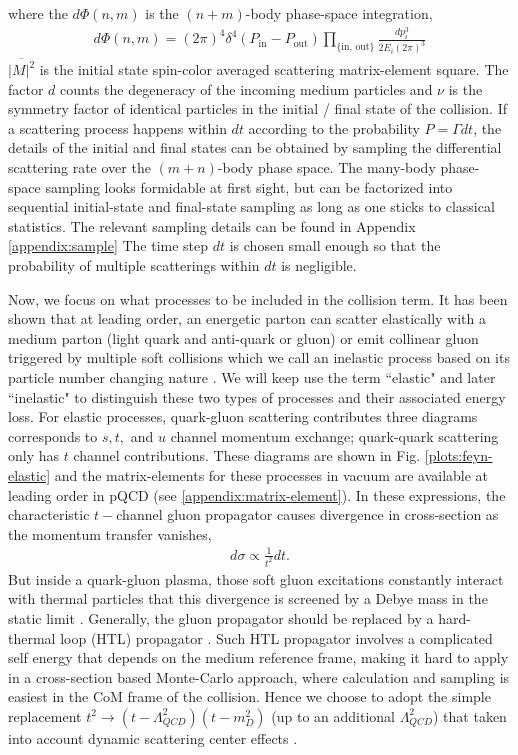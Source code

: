 \documentclass[aps, prc, reprint, amsmath, groupedaddress, nofootinbib]{revtex4-1}
\begin{document}
where the $d\Phi(n,m)$ is the $(n+m)$-body phase-space integration,
\begin{eqnarray}
\nonumber
d\Phi(n,m) = (2\pi)^4\delta^4\left(P_{\textrm{in}}-P_{\textrm{out}}\right)\prod_{\{\textrm{in, out}\}} \frac{dp_i^3}{2E_i(2\pi)^3} 
\end{eqnarray}
$\overline{|M|^2}$ is the initial state spin-color averaged scattering matrix-element square.
The factor $d$ counts the degeneracy of the incoming medium particles and $\nu$ is the symmetry factor of identical particles in the initial / final state of the collision.
If a scattering process happens within $dt$ according to the probability $P=\Gamma dt$, the details of the initial and final states can be obtained by sampling the differential scattering rate over the $(m+n)$-body phase space.
The many-body phase-space sampling looks formidable at first sight, but can be factorized into sequential initial-state and final-state sampling as long as one sticks to classical statistics.
The relevant sampling details can be found in Appendix \ref{appendix:sample}
The time step $dt$ is chosen small enough so that the probability of multiple scatterings within $dt$ is negligible. 

Now, we focus on what processes to be included in the collision term.
It has been shown that at leading order, an energetic parton can scatter elastically with a medium parton (light quark and anti-quark or gluon) or emit collinear gluon triggered by multiple soft collisions which we call an inelastic process based on its particle number changing nature \cite{Arnold:2002zm}.
We will keep use the term ``elastic" and later ``inelastic" to distinguish these two types of processes and their associated energy loss.
For elastic processes, quark-gluon scattering contributes three diagrams corresponds to $s, t,$ and $u$ channel momentum exchange; quark-quark scattering only has $t$ channel contributions. 
These diagrams are shown in Fig. \ref{plots:feyn-elastic} and the matrix-elements for these processes in vacuum are available at leading order in pQCD (see \ref{appendix:matrix-element}).
In these expressions, the characteristic $t-$channel gluon propagator causes divergence in cross-section as the momentum transfer vanishes,
\begin{eqnarray}
d\sigma \propto \frac{1}{t^2} dt.
\end{eqnarray}
But inside a quark-gluon plasma, those soft gluon excitations constantly interact with thermal particles that this divergence is screened by a Debye mass in the static limit \cite{Moore:2004tg}.
Generally, the gluon propagator should be replaced by a hard-thermal loop (HTL) propagator \cite{Peshier:1998dy}.
Such HTL propagator involves a complicated self energy that depends on the medium reference frame, making it hard to apply in a cross-section based Monte-Carlo approach, where calculation and sampling is easiest in the CoM frame of the collision.
Hence we choose to adopt the simple replacement $t^2 \rightarrow (t-\Lambda_{QCD}^2)(t - m_D^2)$ (up to an additional $\Lambda_{QCD}^2$) that taken into account dynamic scattering center effects \cite{Djordjevic:2008iz}.
\end{document}
